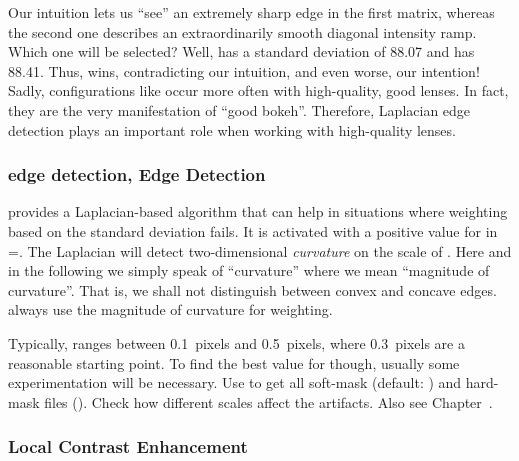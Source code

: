 Our intuition lets us ``see'' an extremely sharp edge in the first matrix, whereas the second
one describes an extraordinarily smooth diagonal intensity ramp.  Which one will be selected?
Well,  has a standard deviation of 88.07 and  has 88.41.
Thus,  wins, contradicting our intuition, and even worse, our intention!
Sadly, configurations like  occur more often with high-quality, good
 lenses.  In fact, they are the very manifestation of
``good bokeh''.  Therefore, Laplacian edge detection plays an important role when working with
high-quality lenses.


\subsubsection[\propername{Laplacian} Edge Detection]{\label{sec:laplacian-edge-detection}%
         {edge detection, }%
   Edge Detection}

\App{} provides a Laplacian-based algorithm that can help in situations where weighting based on
the standard deviation fails.  It is activated with a positive value for  in
=.  The Laplacian will detect two-dimensional
\emph{curvature} on the scale of .  Here and in the following we simply speak of
``curvature'' where we mean ``magnitude of curvature''.  That is, we shall not distinguish
between convex and concave edges.  \App{} always use the magnitude of curvature for weighting.

Typically,  ranges between 0.1~pixels and 0.5~pixels, where 0.3~pixels are a
reasonable starting point.  To find the best value for  though, usually some
experimentation will be necessary.  Use  to get all soft-mask (default:
\mbox{}) and hard-mask files
(\mbox{}).  Check how different scales affect the
artifacts.  Also see Chapter~.


\subsubsection[Local Contrast Enhancement]{\label{sec:local-contrast-enhancement}%
  Local Contrast Enhancement}

